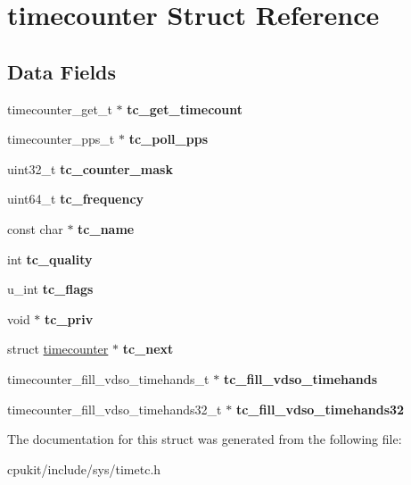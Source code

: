 \hypertarget{structtimecounter}{}\section{timecounter Struct Reference}
\label{structtimecounter}
\subsection*{Data Fields}
\begin{DoxyCompactItemize}
\item 
\mbox{\label{structtimecounter_a0869d7f6fac33b2f599efc5afdc9eb74}} 
timecounter\+\_\+get\+\_\+t $\ast$ {\bfseries tc\+\_\+get\+\_\+timecount}
\item 
\mbox{\label{structtimecounter_a8ebc68c9ec7fc8c3177309b93c15a7a1}} 
timecounter\+\_\+pps\+\_\+t $\ast$ {\bfseries tc\+\_\+poll\+\_\+pps}
\item 
\mbox{\label{structtimecounter_a5506e22df7ea607929f899384746b48f}} 
uint32\+\_\+t {\bfseries tc\+\_\+counter\+\_\+mask}
\item 
\mbox{\label{structtimecounter_a85da0f4b601de728c06f1206e47ce672}} 
uint64\+\_\+t {\bfseries tc\+\_\+frequency}
\item 
\mbox{\label{structtimecounter_a944b37e666c456257674fde00f4d5253}} 
const char $\ast$ {\bfseries tc\+\_\+name}
\item 
\mbox{\label{structtimecounter_ae1b98f4808c3a71f6eaf1b6645368503}} 
int {\bfseries tc\+\_\+quality}
\item 
\mbox{\label{structtimecounter_a7ad96b441b7da35bd54dd13a68308637}} 
u\+\_\+int {\bfseries tc\+\_\+flags}
\item 
\mbox{\label{structtimecounter_ae524c27b11e4a66a50872fc1a951dd8c}} 
void $\ast$ {\bfseries tc\+\_\+priv}
\item 
\mbox{\label{structtimecounter_aa4909e69f3241bcb2898caef3e6f9369}} 
struct \mbox{\hyperlink{structtimecounter}{timecounter}} $\ast$ {\bfseries tc\+\_\+next}
\item 
\mbox{\label{structtimecounter_a42daed73ca5674ad5bdb87fac8a4f998}} 
timecounter\+\_\+fill\+\_\+vdso\+\_\+timehands\+\_\+t $\ast$ {\bfseries tc\+\_\+fill\+\_\+vdso\+\_\+timehands}
\item 
\mbox{\label{structtimecounter_aa219e49568a41a4e82546363e3ac4977}} 
timecounter\+\_\+fill\+\_\+vdso\+\_\+timehands32\+\_\+t $\ast$ {\bfseries tc\+\_\+fill\+\_\+vdso\+\_\+timehands32}
\end{DoxyCompactItemize}


The documentation for this struct was generated from the following file\+:\begin{DoxyCompactItemize}
\item 
cpukit/include/sys/timetc.\+h\end{DoxyCompactItemize}
